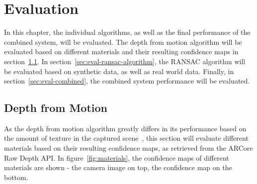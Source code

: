 \chapter{Evaluation}\label{ch:evaluation}
In this chapter, the individual algorithms, as well as the final performance of the combined system, will be evaluated.
The depth from motion algorithm will be evaluated based on different materials and their resulting confidence maps in section~\ref{sec:eval-depth-from-motion}.
In section~\ref{sec:eval-ransac-algorithm}, the RANSAC algorithm will be evaluated based on synthetic data, as well as real world data.
Finally, in section~\ref{sec:eval-combined}, the combined system performance will be evaluated.

\section{Depth from Motion}\label{sec:eval-depth-from-motion}
As the depth from motion algorithm greatly differs in its performance based on the amount of texture in the captured scene~\cite{google_llc_arcore_doc},
this section will evaluate different materials based on their resulting confidence maps, as retrieved from the ARCore Raw Depth API\@.
In figure~\ref{fig:materials}, the confidence maps of different materials are shown - the camera image on top, the confidence map on the bottom.

